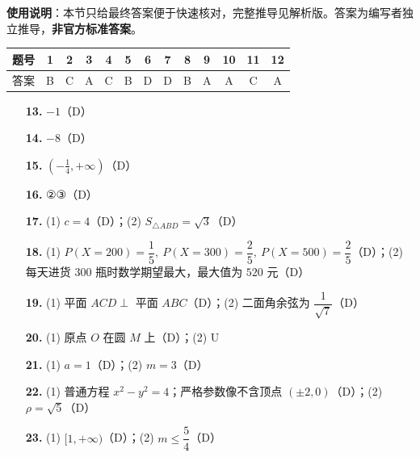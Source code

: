 
\begin{gknotice}
\textbf{使用说明}：本节只给最终答案便于快速核对，完整推导见解析版。答案为编写者独立推导，\textbf{非官方标准答案}。
\end{gknotice}

\begin{center}\begin{tabular}{ccccccccccccc}
\toprule
题号 & 1 & 2 & 3 & 4 & 5 & 6 & 7 & 8 & 9 & 10 & 11 & 12 \\
\midrule
答案 & B & C & A & C & B & D & D & B & A & A & C & A \\
\bottomrule
\end{tabular}\end{center}

\begin{itemize}[leftmargin=2.6em]
  \item[\textbf{13.}] \(-1\)（D）
  \item[\textbf{14.}] \(-8\)（D）
  \item[\textbf{15.}] \((-\tfrac14,+\infty)\)（D）
  \item[\textbf{16.}] ②③（D）
\end{itemize}

\begin{itemize}[leftmargin=2.6em]
  \item[\textbf{17.}] (1) \(c=4\)（D）；(2) \(S_{\triangle ABD}=\sqrt3\)（D）
  \item[\textbf{18.}] (1) \(P(X=200)=\dfrac15,\ P(X=300)=\dfrac25,\ P(X=500)=\dfrac25\)（D）；(2) 每天进货 \(300\) 瓶时数学期望最大，最大值为 \(520\) 元（D）
  \item[\textbf{19.}] (1) 平面 \(ACD\perp\) 平面 \(ABC\)（D）；(2) 二面角余弦为 \(\dfrac1{\sqrt7}\)（D）
  \item[\textbf{20.}] (1) 原点 \(O\) 在圆 \(M\) 上（D）；(2) U
  \item[\textbf{21.}] (1) \(a=1\)（D）；(2) \(m=3\)（D）
  \item[\textbf{22.}] (1) 普通方程 \(x^2-y^2=4\)；严格参数像不含顶点 \((\pm2,0)\)（D）；(2) \(\rho=\sqrt5\)（D）
  \item[\textbf{23.}] (1) \([1,+\infty)\)（D）；(2) \(m\le\dfrac54\)（D）
\end{itemize}
